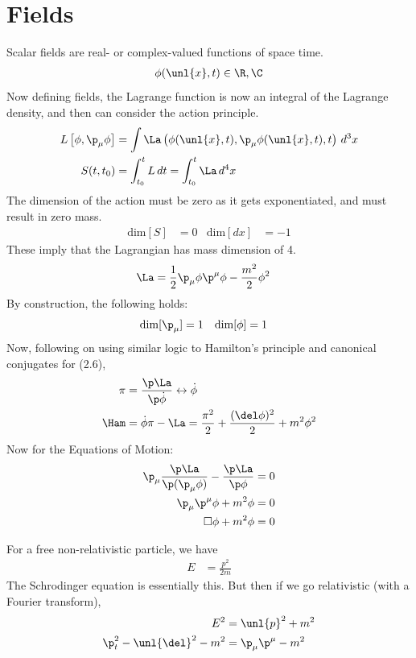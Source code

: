 \documentclass[a4paper, 11pt, normalem]{report}
\begin{document}
\section{Fields}
Scalar fields are real- or complex-valued functions of space time.
\begin{align}
    \phi(\unl{x},t) \in \R,\C
\end{align}
Now defining fields, the Lagrange function is now an integral of the Lagrange density, and then can consider the action principle.
\begin{align}
    L\left[\phi,\p_\mu\phi\right] &= \int \La\left(\phi(\unl{x},t),\p_\mu\phi(\unl{x},t),t\right)\,d^3x \\
    S(t,t_0) &= \int_{t_0}^t L\,dt = \int_{t_0}^t \La\,d^4x
\end{align}
The dimension of the action must be zero as it gets exponentiated, and must result in zero mass.
\begin{align}
    \text{dim}[S] &= 0 & \text{dim}[dx] &= -1
\end{align}
These imply that the Lagrangian has mass dimension of 4.
\begin{align}
    \La &= \frac12\p_\mu\phi\p^\mu\phi - \frac{m^2}{2}\phi^2
\end{align}
By construction, the following holds:
\begin{align}
    \text{dim}[\p_\mu] &= 1 & \text{dim}[\phi] &= 1
\end{align}
Now, following on using similar logic to Hamilton's principle and canonical conjugates for (2.6),
\begin{align}
    \pi &= \frac{\p\La}{\p\dot{\phi}} \leftrightarrow \dot{\phi} \\
    \Ham &= \dot{\phi}\pi - \La = \frac{\pi^2}{2} + \frac{(\del\phi)^2}{2} + m^2\phi^2
\end{align}
Now for the Equations of Motion:
\begin{align}
    \p_\mu \frac{\p\La}{\p(\p_\mu\phi)} - \frac{\p\La}{\p\phi} &= 0 \\
    \p_\mu\p^\mu\phi + m^2\phi &= 0 \\
    \Box\phi + m^2\phi &= 0
\end{align}

\begin{example}
For a free non-relativistic particle, we have
\begin{align}
    E &= \frac{p^2}{2m}
\end{align}
The Schrodinger equation is essentially this.
But then if we go relativistic (with a Fourier transform),
\begin{align}
    E^2 &= \unl{p}^2 + m^2 \\
    \p_t^2 - \unl{\del}^2 - m^2 &= \p_\mu\p^\mu - m^2
\end{align}
\end{example}
\end{document}
